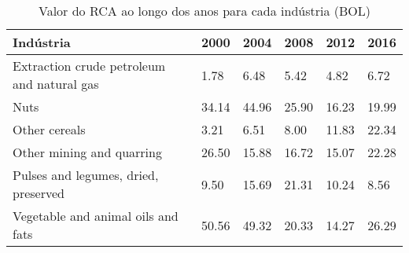 \begin{table}
\centering
\caption{Valor do RCA ao longo dos anos para cada indústria (BOL)}
\begin{tabular}{p{6cm}p{1.5cm}p{1.5cm}p{1.5cm}p{1.5cm}p{1.5cm}}
\toprule
                                 Indústria &  2000 &  2004 &  2008 &  2012 &  2016 \\
\midrule
Extraction crude petroleum and natural gas &  1.78 &  6.48 &  5.42 &  4.82 &  6.72 \\
                                      Nuts & 34.14 & 44.96 & 25.90 & 16.23 & 19.99 \\
                             Other cereals &  3.21 &  6.51 &  8.00 & 11.83 & 22.34 \\
                 Other mining and quarring & 26.50 & 15.88 & 16.72 & 15.07 & 22.28 \\
      Pulses and legumes, dried, preserved &  9.50 & 15.69 & 21.31 & 10.24 &  8.56 \\
        Vegetable and animal oils and fats & 50.56 & 49.32 & 20.33 & 14.27 & 26.29 \\
\bottomrule
\end{tabular}
\end{table}
